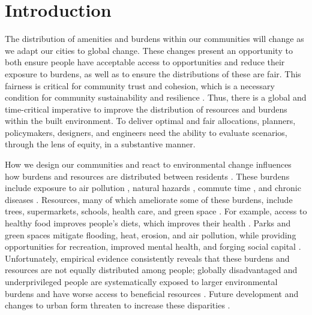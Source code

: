 \documentclass[final,3p,times,onecolumn,sort&compress]{elsarticle}
\begin{document}

\section{Introduction}
The distribution of amenities and burdens within our communities will change as we adapt our cities to global change.
These changes present an opportunity to both ensure people have acceptable access to opportunities and reduce their exposure to burdens, as well as to ensure the distributions of these are fair.
This fairness is critical for community trust and cohesion, which is a necessary condition for community sustainability and resilience \citep{Dempsey2011-og, Cutter2008-NJ, Logan2020-vj}.
Thus, there is a global and time-critical imperative to improve the distribution of resources and burdens within the built environment.
To deliver optimal and fair allocations, planners, policymakers, designers, and engineers need the ability to evaluate scenarios, through the lens of equity, in a substantive manner.

How we design our communities and react to environmental change influences how burdens and resources are distributed between residents \citep{Marino2012-lq,Wilson2008-yk, Calvin2017-ja}.
These burdens include exposure to air pollution \citep{Maguire2011-fi, Sheriff2020-ge}, natural hazards \citep{Burby2000-qe, Saunders2007-of}, commute time \citep{Frumkin2004-yi}, and chronic diseases \citep{Lopez2006-jb}.
Resources, many of which ameliorate some of these burdens, include trees, supermarkets, schools, health care, and green space \citep{Schwarz2015-fs, Logan2019-fr, Nesbitt2019-sk, Pacione1989-ui, Apparicio2007-di, Whitehead2019-tf}.
For example, access to healthy food improves people's diets, which improves their health \citep{Garcia2020-xt, Kolak2018-az}.
Parks and green spaces mitigate flooding, heat, erosion, and air pollution, while providing opportunities for recreation, improved mental health, and forging social capital \citep{Dempsey2011-og, Astell-Burt2013-og,Kazmierczak2011-ot, Norton2015-vv}.
Unfortunately, empirical evidence consistently reveals that these burdens and resources are not equally distributed among people;
globally disadvantaged and underprivileged people are systematically exposed to larger environmental burdens and have worse access to beneficial resources \citep{Fussel2010-te, Bulkeley2014-so}.
Future development and changes to urban form threaten to increase these disparities \citep{Gusdorf2008-bm, Calvin2017-ja}.
\end{document}
